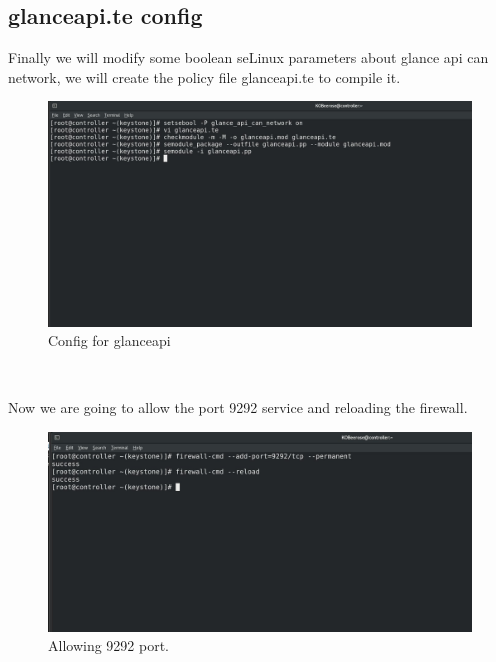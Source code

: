 \begin{spacing}{1.2}
\section{glanceapi.te config}
\par 
Finally we will modify some boolean seLinux parameters about glance api can network, we will create the policy file glanceapi.te to compile it. 
\\
\begin{figure}[!htb] 
\begin{center} 
\includegraphics[width=1\linewidth]{Cloud/Configure Glance/Config for glanceapi} 
\end{center} 
\caption{Config for glanceapi} 
\end{figure}  \FloatBarrier
\\

\par 
Now we are going to allow the port 9292 service and reloading the firewall.
\\
\begin{figure}[!htb] 
\begin{center} 
\includegraphics[width=1\linewidth]{Cloud/Configure Glance/Allowing 9292 port.} 
\end{center} 
\caption{Allowing 9292 port.} 
\end{figure}  \FloatBarrier
\\


\end{spacing}